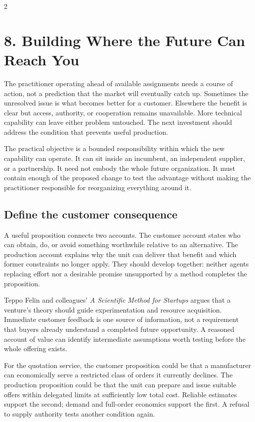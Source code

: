 \ReusableCoInventionArt

\clearpage
\begin{multicols}{2}

\section{8. Building Where the Future Can Reach
You}\label{building-where-the-future-can-reach-you}

The practitioner operating ahead of available assignments needs a course
of action, not a prediction that the market will eventually catch up.
Sometimes the unresolved issue is what becomes better for a customer.
Elsewhere the benefit is clear but access, authority, or cooperation
remains unavailable. More technical capability can leave either problem
untouched. The next investment should address the condition that
prevents useful production.

The practical objective is a bounded responsibility within which the new
capability can operate. It can sit inside an incumbent, an independent
supplier, or a partnership. It need not embody the whole future
organization. It must contain enough of the proposed change to test the
advantage without making the practitioner responsible for reorganizing
everything around it.

\subsection{Define the customer
consequence}\label{define-the-customer-consequence}

A useful proposition connects two accounts. The customer account states
who can obtain, do, or avoid something worthwhile relative to an
alternative. The production account explains why the unit can deliver
that benefit and which former constraints no longer apply. They should
develop together: neither agents replacing effort nor a desirable
promise unsupported by a method completes the proposition.

Teppo Felin and colleagues' \emph{A Scientific Method for Startups}
\citep{felin2024scientific} argues that a venture's theory should guide
experimentation and resource acquisition. Immediate customer feedback is
one source of information, not a requirement that buyers already
understand a completed future opportunity. A reasoned account of value
can identify intermediate assumptions worth testing before the whole
offering exists.

For the quotation service, the customer proposition could be that a
manufacturer can economically serve a restricted class of orders it
currently declines. The production proposition could be that the unit
can prepare and issue suitable offers within delegated limits at
sufficiently low total cost. Reliable estimates support the second;
demand and full-order economics support the first. A refusal to supply
authority tests another condition again.


\end{multicols}
